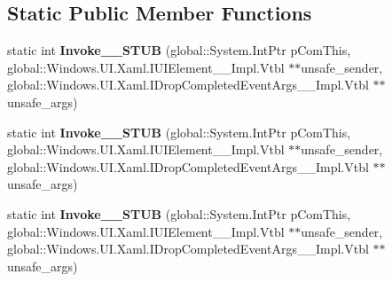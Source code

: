 \subsection*{Static Public Member Functions}
\begin{DoxyCompactItemize}
\item 
\mbox{\label{struct_windows_1_1_foundation_1_1_typed_event_handler___a___windows___u_i___xaml___u_i_element__c6192b159f25e6e797ea21530cd542d3_aa9713a422cb8c1611d7a10b478cbf5b8}} 
static int {\bfseries Invoke\+\_\+\+\_\+\+S\+T\+UB} (global\+::\+System.\+Int\+Ptr p\+Com\+This, global\+::\+Windows.\+U\+I.\+Xaml.\+I\+U\+I\+Element\+\_\+\+\_\+\+Impl.\+Vtbl $\ast$$\ast$unsafe\+\_\+sender, global\+::\+Windows.\+U\+I.\+Xaml.\+I\+Drop\+Completed\+Event\+Args\+\_\+\+\_\+\+Impl.\+Vtbl $\ast$$\ast$unsafe\+\_\+args)
\item 
\mbox{\label{struct_windows_1_1_foundation_1_1_typed_event_handler___a___windows___u_i___xaml___u_i_element__c6192b159f25e6e797ea21530cd542d3_aa9713a422cb8c1611d7a10b478cbf5b8}} 
static int {\bfseries Invoke\+\_\+\+\_\+\+S\+T\+UB} (global\+::\+System.\+Int\+Ptr p\+Com\+This, global\+::\+Windows.\+U\+I.\+Xaml.\+I\+U\+I\+Element\+\_\+\+\_\+\+Impl.\+Vtbl $\ast$$\ast$unsafe\+\_\+sender, global\+::\+Windows.\+U\+I.\+Xaml.\+I\+Drop\+Completed\+Event\+Args\+\_\+\+\_\+\+Impl.\+Vtbl $\ast$$\ast$unsafe\+\_\+args)
\item 
\mbox{\label{struct_windows_1_1_foundation_1_1_typed_event_handler___a___windows___u_i___xaml___u_i_element__c6192b159f25e6e797ea21530cd542d3_aa9713a422cb8c1611d7a10b478cbf5b8}} 
static int {\bfseries Invoke\+\_\+\+\_\+\+S\+T\+UB} (global\+::\+System.\+Int\+Ptr p\+Com\+This, global\+::\+Windows.\+U\+I.\+Xaml.\+I\+U\+I\+Element\+\_\+\+\_\+\+Impl.\+Vtbl $\ast$$\ast$unsafe\+\_\+sender, global\+::\+Windows.\+U\+I.\+Xaml.\+I\+Drop\+Completed\+Event\+Args\+\_\+\+\_\+\+Impl.\+Vtbl $\ast$$\ast$unsafe\+\_\+args)
\item 
\mbox{\label{struct_windows_1_1_foundation_1_1_typed_event_handler___a___windows___u_i___xaml___u_i_element__c6192b159f25e6e797ea21530cd542d3_aa9713a422cb8c1611d7a10b478cbf5b8}} 

\end{DoxyCompactItemize}
